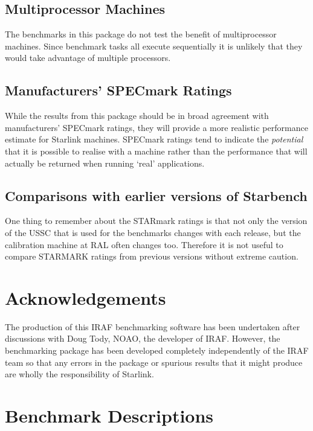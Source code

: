 \subsection{Multiprocessor Machines}

The benchmarks in this package do not test the benefit of multiprocessor
machines. Since benchmark tasks all execute sequentially it is unlikely 
that they would take advantage of multiple processors.

\subsection{Manufacturers' SPECmark Ratings}

While the results from this package should be in broad agreement with
manufacturers' SPECmark ratings, they will provide a more realistic
performance estimate for Starlink machines. SPECmark ratings tend to
indicate the {\em potential} that it is possible to realise with a
machine rather than the performance that will actually be returned when
running `real' applications.

\subsection{Comparisons with earlier versions of Starbench}

One thing to remember about the STARmark ratings is that not only the
version of the USSC that is used for the benchmarks changes with each
release, but the calibration machine at RAL often changes too.  Therefore it
is not useful to compare STARMARK ratings from previous versions without
extreme caution.

\section{Acknowledgements}

The production of this IRAF benchmarking software has been undertaken
after discussions with Doug Tody, NOAO, the developer of IRAF.  However,
the benchmarking package has been developed completely independently of
the IRAF team so that any errors in the package or spurious results that
it might produce are wholly the responsibility of Starlink.
 
\newpage
\appendix
\section{Benchmark Descriptions}
\label{benchmark_descriptions}

